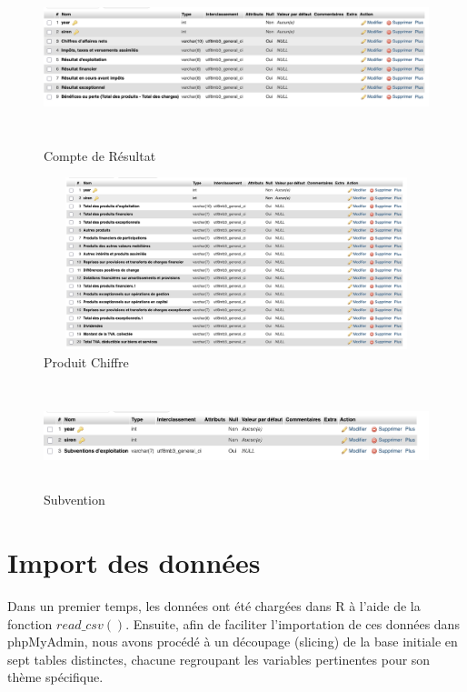 \documentclass[mstat,12pt]{unswthesis}
\begin{document}
\begin{figure}
\centering
\includegraphics[width=15cm,height=5cm]{image_sql/compte_resulta.png}
\caption{Compte de Résultat}\label{compte_resulta}
\end{figure}

\begin{figure}
\centering
\includegraphics[width=15cm,height=5cm]{image_sql/produit_chiffre.png}
\caption{Produit Chiffre}\label{produit_chiffre}
\end{figure}

\begin{figure}
\centering
\includegraphics[width=15cm,height=3cm]{image_sql/subvention.png}
\caption{Subvention}\label{subvention}
\end{figure}

\newpage

\bigskip

\section{Import des données}\label{import-des-donnuxe9es}

\bigskip

Dans un premier temps, les données ont été chargées dans R à l'aide de
la fonction \(read\_csv()\). Ensuite, afin de faciliter l'importation de
ces données dans phpMyAdmin, nous avons procédé à un découpage (slicing)
de la base initiale en sept tables distinctes, chacune regroupant les
variables pertinentes pour son thème spécifique.
\end{document}
